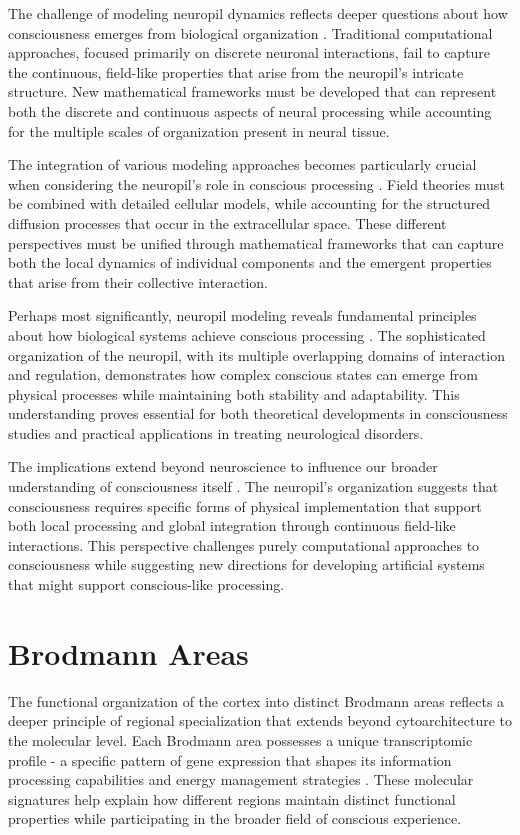 \begin{refsection}
The challenge of modeling neuropil dynamics reflects deeper questions about how consciousness emerges from biological organization \cite{Denk2004}. Traditional computational approaches, focused primarily on discrete neuronal interactions, fail to capture the continuous, field-like properties that arise from the neuropil's intricate structure. New mathematical frameworks must be developed that can represent both the discrete and continuous aspects of neural processing while accounting for the multiple scales of organization present in neural tissue.

The integration of various modeling approaches becomes particularly crucial when considering the neuropil's role in conscious processing \cite{Haehn2014}. Field theories must be combined with detailed cellular models, while accounting for the structured diffusion processes that occur in the extracellular space. These different perspectives must be unified through mathematical frameworks that can capture both the local dynamics of individual components and the emergent properties that arise from their collective interaction.

Perhaps most significantly, neuropil modeling reveals fundamental principles about how biological systems achieve conscious processing \cite{Helmstaedter2013}. The sophisticated organization of the neuropil, with its multiple overlapping domains of interaction and regulation, demonstrates how complex conscious states can emerge from physical processes while maintaining both stability and adaptability. This understanding proves essential for both theoretical developments in consciousness studies and practical applications in treating neurological disorders.

The implications extend beyond neuroscience to influence our broader understanding of consciousness itself \cite{White1986}. The neuropil's organization suggests that consciousness requires specific forms of physical implementation that support both local processing and global integration through continuous field-like interactions. This perspective challenges purely computational approaches to consciousness while suggesting new directions for developing artificial systems that might support conscious-like processing.

\section{Brodmann Areas}

The functional organization of the cortex into distinct Brodmann areas reflects a deeper principle of regional specialization that extends beyond cytoarchitecture to the molecular level. Each Brodmann area possesses a unique transcriptomic profile - a specific pattern of gene expression that shapes its information processing capabilities and energy management strategies \cite{Amunts2015}. These molecular signatures help explain how different regions maintain distinct functional properties while participating in the broader field of conscious experience.


\end{refsection}
